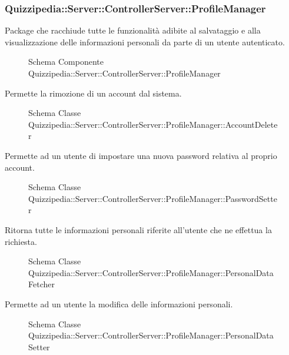 \subsubsection{Quizzipedia::Server::ControllerServer::ProfileManager}
Package che racchiude tutte le funzionalità adibite al salvataggio e alla visualizzazione delle informazioni personali da parte di un utente autenticato.
\begin{figure}[H]
\centering
\noindent{}
\caption{Schema Componente Quizzipedia::Server::ControllerServer::ProfileManager}
\end{figure}
Permette la rimozione di un account dal sistema.
\begin{figure}[H]
\centering
\noindent{}
\caption{Schema Classe Quizzipedia::Server::ControllerServer::ProfileManager::AccountDeleter}
\end{figure}
Permette ad un utente di impostare una nuova password relativa al proprio account.
\begin{figure}[H]
\centering
\noindent{}
\caption{Schema Classe Quizzipedia::Server::ControllerServer::ProfileManager::PasswordSetter}
\end{figure}
Ritorna tutte le informazioni personali riferite all'utente che ne effettua la richiesta.
\begin{figure}[H]
\centering
\noindent{}
\caption{Schema Classe Quizzipedia::Server::ControllerServer::ProfileManager::PersonalDataFetcher}
\end{figure}
Permette ad un utente la modifica delle informazioni personali.
\begin{figure}[H]
\centering
\noindent{}
\caption{Schema Classe Quizzipedia::Server::ControllerServer::ProfileManager::PersonalDataSetter}
\end{figure}
